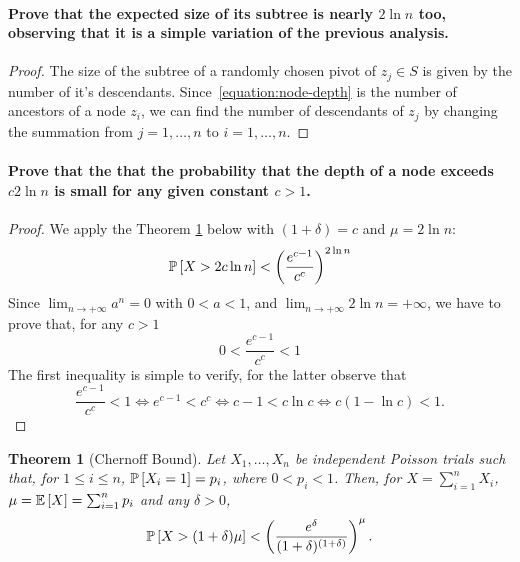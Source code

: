 \paragraph{Prove that the expected size of its subtree is nearly $2 \ln n$ too,
observing that it is a simple variation of the previous analysis.}

\begin{proof}
  The size of the subtree of a randomly chosen pivot of $z_j\in S$ is given by
  the number of it's descendants. Since~\eqref{equation:node-depth} is the
  number of ancestors of a node $z_i$, we can find the number of descendants of
  $z_j$ by changing the summation from $j=1,\dotsc,n$ to $i=1,\dotsc,n$.
\end{proof}

\paragraph{Prove that the that the probability that the depth of a node exceeds $c2 \ln n$ is small for any given constant $c > 1$.}

\begin{proof}
  We apply the Theorem \ref{theorem:chernoff} below with $(1+\delta)=c$ and $\mu=2 \ln n$:
  $$\operatorname*{\mathbb{P}}\left[{X>2c\ln n}\right]<\left(\frac{e^{c-1}}{c^c}\right)^{2 \ln n}$$
  Since $\lim_{n\to+\infty}a^n=0$ with $0<a<1$, and $\lim_{n\to+\infty}2\ln n= +\infty$, we have to prove that, for any $c>1$
  $$0<\frac{e^{c-1}}{c^c}<1$$
  The first inequality is simple to verify, for the latter observe that
  $$\frac{e^{c-1}}{c^c}<1 \iff e^{c-1}<c^c \iff c-1 < c\ln c \iff c(1-\ln c)<1.$$
\end{proof}

\newtheorem{thm}{Theorem}
\begin{thm}[Chernoff Bound]\label{theorem:chernoff}
  Let $X_1, \dots, X_n$ be independent Poisson trials such that, for $1 \leq i \leq n$, $\operatorname*{\mathbb{P}}\left[{X_i=1}\right]=p_i$, where $0 < p_i < 1$. Then, for $X=\sum_{i=1}^n X_i$, $\mu=\mathbb{E}\left[{X}\right]=\sum_{i=1}^n p_i$ and any $\delta>0$,
	$$\operatorname*{\mathbb{P}}\left[{X>(1+\delta )\mu}\right]<\left({\frac {e^{\delta }}{(1+\delta )^{(1+\delta )}}}\right)^\mu.$$
\end{thm}
